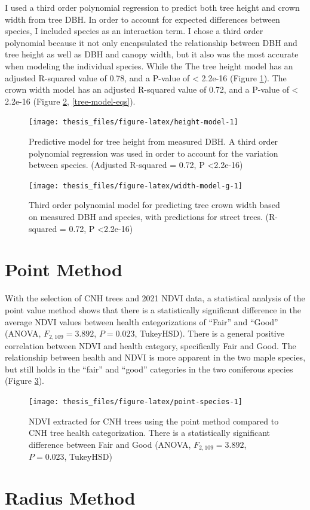 \documentclass[12pt,twoside]{reedthesis}
\begin{document}
I used a third order polynomial regression to predict both tree height and crown width from tree DBH. In order to account for expected differences between species, I included species as an interaction term. I chose a third order polynomial because it not only encapsulated the relationship between DBH and tree height as well as DBH and canopy width, but it also was the most accurate when modeling the individual species. While the
The tree height model has an adjusted R-squared value of 0.78, and a P-value of \textless{} 2.2e-16 (Figure \ref{fig:height-model}). The crown width model has an adjusted R-squared value of 0.72, and a P-value of \textless{} 2.2e-16 (Figure \ref{fig:width-model-g}, \ref{tree-model-eqs}).
\begin{figure}
\texttt{[image: thesis\_files/figure-latex/height-model-1]} \caption[Tree height predictive model]{Predictive model for tree height from measured DBH. A third order polynomial regression was used in order to account for the variation between species. (Adjusted R-squared = 0.72, P <2.2e-16)}\label{fig:height-model}
\end{figure}
\begin{figure}
\texttt{[image: thesis\_files/figure-latex/width-model-g-1]} \caption[Crown width predictive model]{Third order polynomial model for predicting tree crown width based on measured DBH and species, with predictions for street trees. (R-squared = 0.72,  P <2.2e-16)}\label{fig:width-model-g}
\end{figure}
\hypertarget{point-method-1}{%
\section{Point Method}\label{point-method-1}}

With the selection of CNH trees and 2021 NDVI data, a statistical analysis of the point value method shows that there is a statistically significant difference in the average NDVI values between health categorizations of ``Fair'' and ``Good'' (ANOVA, \(F_{2, 109} = 3.892\), \(P = 0.023\), TukeyHSD). There is a general positive correlation between NDVI and health category, specifically Fair and Good. The relationship between health and NDVI is more apparent in the two maple species, but still holds in the ``fair'' and ``good'' categories in the two coniferous species (Figure \ref{fig:point-species}).
\begin{figure}
\texttt{[image: thesis\_files/figure-latex/point-species-1]} \caption[Point Method NDVI and Health Rating, by Species]{NDVI extracted for CNH trees using the point method compared to CNH tree health categorization. There is a statistically significant difference between Fair and Good (ANOVA, $F_{2, 109} = 3.892$, $P = 0.023$, TukeyHSD)}\label{fig:point-species}
\end{figure}
\hypertarget{radius-method-1}{%
\section{Radius Method}\label{radius-method-1}}
\end{document}
